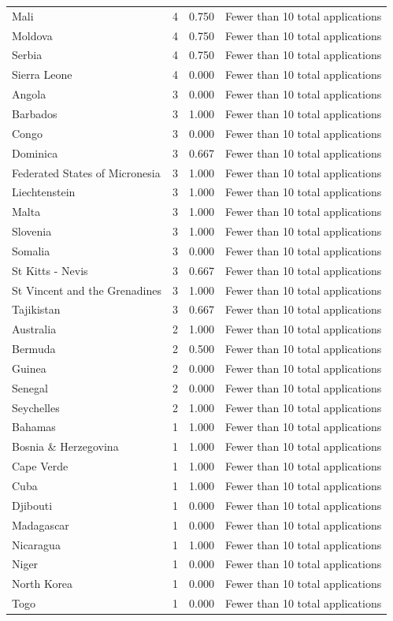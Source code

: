 \documentclass[runningheads]{llncs}
\begin{document}
{\begin{longtable}{p{}rrp{}}
Mali & 4 & 0.750 & Fewer than 10 total applications \\
Moldova & 4 & 0.750 & Fewer than 10 total applications \\
Serbia & 4 & 0.750 & Fewer than 10 total applications \\
Sierra Leone & 4 & 0.000 & Fewer than 10 total applications \\
Angola & 3 & 0.000 & Fewer than 10 total applications \\
Barbados & 3 & 1.000 & Fewer than 10 total applications \\
Congo & 3 & 0.000 & Fewer than 10 total applications \\
Dominica & 3 & 0.667 & Fewer than 10 total applications \\
Federated States of Micronesia & 3 & 1.000 & Fewer than 10 total applications \\
Liechtenstein & 3 & 1.000 & Fewer than 10 total applications \\
Malta & 3 & 1.000 & Fewer than 10 total applications \\
Slovenia & 3 & 1.000 & Fewer than 10 total applications \\
Somalia & 3 & 0.000 & Fewer than 10 total applications \\
St Kitts - Nevis & 3 & 0.667 & Fewer than 10 total applications \\
St Vincent and the Grenadines & 3 & 1.000 & Fewer than 10 total applications \\
Tajikistan & 3 & 0.667 & Fewer than 10 total applications \\
Australia & 2 & 1.000 & Fewer than 10 total applications \\
Bermuda & 2 & 0.500 & Fewer than 10 total applications \\
Guinea & 2 & 0.000 & Fewer than 10 total applications \\
Senegal & 2 & 0.000 & Fewer than 10 total applications \\
Seychelles & 2 & 1.000 & Fewer than 10 total applications \\
Bahamas & 1 & 1.000 & Fewer than 10 total applications \\
Bosnia \& Herzegovina & 1 & 1.000 & Fewer than 10 total applications \\
Cape Verde & 1 & 1.000 & Fewer than 10 total applications \\
Cuba & 1 & 1.000 & Fewer than 10 total applications \\
Djibouti & 1 & 0.000 & Fewer than 10 total applications \\
Madagascar & 1 & 0.000 & Fewer than 10 total applications \\
Nicaragua & 1 & 1.000 & Fewer than 10 total applications \\
Niger & 1 & 0.000 & Fewer than 10 total applications \\
North Korea & 1 & 0.000 & Fewer than 10 total applications \\
Togo & 1 & 0.000 & Fewer than 10 total applications \\
\hline
\end{longtable}
}
\end{document}
